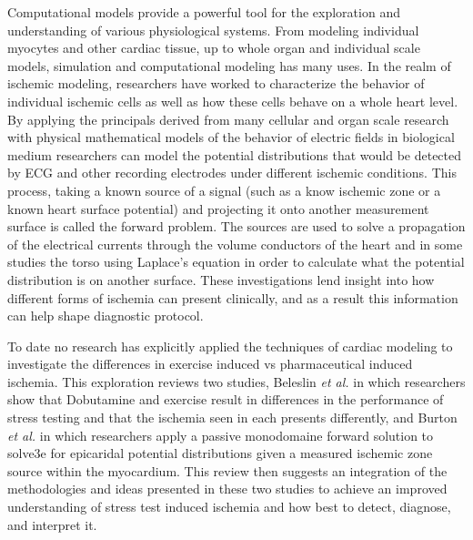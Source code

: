 \documentclass[12pt]{article}
\newcommand{\etal}{{\em et al.}}
\begin{document}
Computational models provide a powerful tool for the exploration and understanding of various physiological systems. From modeling individual myocytes and other cardiac tissue, up to whole organ and individual scale models, simulation and computational modeling has many uses.\cite{TenTusscher2003,RSM:Bur2018b,Zenger2019} In the realm of ischemic modeling, researchers have worked to characterize the behavior of individual ischemic cells as well as how these cells behave on a whole heart level.\cite{BMB:Hop2004b,RSM:Bur2018b} By applying the principals derived from many cellular and organ scale research with physical mathematical models of the behavior of electric fields in biological medium researchers can model the potential distributions that would be detected by ECG and other recording electrodes under different ischemic conditions. This process, taking a known source of a signal (such as a know ischemic zone or a known heart surface potential) and projecting it onto another measurement surface is called the forward problem. The sources are used to solve a propagation of the electrical currents through the volume conductors of the heart and in some studies the torso using Laplace's equation in order to calculate what the potential distribution is on another surface.\cite{RSM:Bea2015a} These investigations lend insight into how different forms of ischemia can present clinically, and as a result this information can help shape diagnostic protocol. 

To date no research has explicitly applied the techniques of cardiac modeling to investigate the differences in exercise induced vs pharmaceutical induced ischemia. This exploration reviews two studies, Beleslin \etal\cite{Beleslin1994} in which researchers show that Dobutamine and exercise result in differences in the performance of stress testing and that the ischemia seen in each presents differently, and Burton \etal\cite{RSM:Bur2018b} in which researchers apply a passive monodomaine forward solution to solve3e for epicaridal potential distributions given a measured ischemic zone source within the myocardium. This review then suggests an integration of the methodologies and ideas presented in these two studies to achieve an improved understanding of stress test induced ischemia and how best to detect, diagnose, and interpret it.


\end{document}
